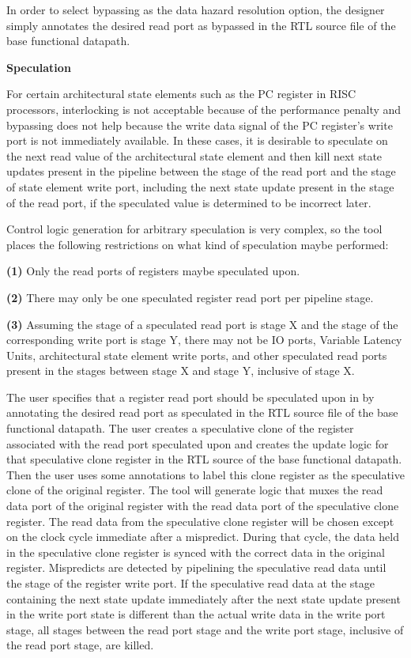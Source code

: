 In order to select bypassing as the data hazard resolution option, the designer simply annotates the desired read port as bypassed in the RTL source file of the base functional datapath.

{\bf Speculation}

For certain architectural state elements such as the PC register in RISC processors, interlocking is not acceptable because of the performance penalty and bypassing does not help because the write data signal of the PC register's write port is not immediately available. In these cases, it is desirable to speculate on the next read value of the architectural state element and then kill next state updates present in the pipeline between the stage of the read port and the stage of state element write port, including the next state update present in the stage of the read port, if the speculated value is determined to be incorrect later.

Control logic generation for arbitrary speculation is very complex, so the tool places the following restrictions on what kind of speculation maybe performed:

{\bf (1)} Only the read ports of registers maybe speculated upon.

{\bf (2)} There may only be one speculated register read port per pipeline stage.

{\bf (3)} Assuming the stage of a speculated read port is stage X and the stage of the corresponding write port is stage Y, there may not be IO ports, Variable Latency Units, architectural state element write ports, and other speculated read ports present in the stages between stage X and stage Y, inclusive of stage X.

The user specifies that a register read port should be speculated upon in by annotating the desired read port as speculated in the RTL source file of the base functional datapath. The user creates a speculative clone of the register associated with the read port speculated upon and creates the update logic for that speculative clone register in the RTL source of the base functional datapath. Then the user uses some annotations to label this clone register as the speculative clone of the original register. The tool will generate logic that muxes the read data port of the original register with the read data port of the speculative clone register. The read data from the speculative clone register will be chosen except on the clock cycle immediate after a mispredict. During that cycle, the data held in the speculative clone register is synced with the correct data in the original register. Mispredicts are detected by pipelining the speculative read data until the stage of the register write port. If the speculative read data at the stage containing the next state update immediately after the next state update present in the write port state is different than the actual write data in the write port stage, all stages between the read port stage and the write port stage, inclusive of the read port stage, are killed.

